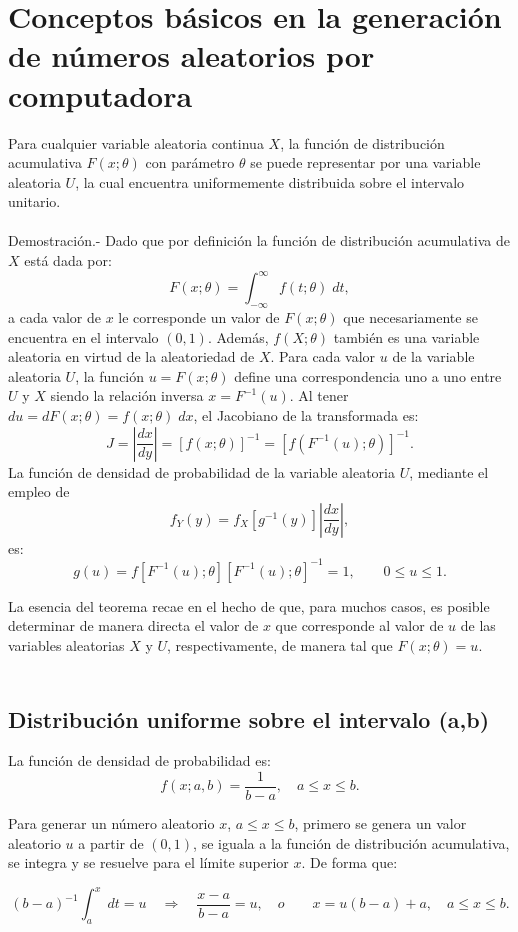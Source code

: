 \section{Conceptos básicos en la generación de números aleatorios por computadora}

\begin{teo}
    Para cualquier variable aleatoria continua $X$, la función de distribución acumulativa $F(x;\theta)$ con parámetro $\theta$ se puede representar por una variable aleatoria $U$, la cual encuentra uniformemente distribuida sobre el intervalo unitario.\\\\
	Demostración.-\; Dado que por definición la función de distribución acumulativa de $X$ está dada por:
	$$F(x;\theta)=\int_{-\infty}^\infty f(t;\theta)\; dt,$$
	a cada valor de $x$ le corresponde un valor de $F(x;\theta)$ que necesariamente se encuentra en el intervalo $(0,1)$. Además, $f(X;\theta)$ también es una variable aleatoria en virtud de la aleatoriedad de $X$. Para cada valor $u$ de la variable aleatoria $U$, la función $u=F(x;\theta)$ define una correspondencia uno a uno entre $U$ y $X$ siendo la relación inversa $x=F^{-1}(u)$. Al tener $du=dF(x;\theta)=f(x; \theta)\; dx$, el Jacobiano de la transformada es:
	$$J=\left|\dfrac{dx}{dy}\right|=[f(x;\theta)]^{-1}=\left[f\left(F^{-1}(u);\theta\right)\right]^{-1}.$$
	La función de densidad de probabilidad de la variable aleatoria $U$, mediante el empleo de $$f_Y(y)=f_X\left[g^{-1}(y)\right]\left|\dfrac{dx}{dy}\right|,$$ es:
	$$g(u)=f\left[F^{-1}(u);\theta\right]\left[F^{-1}(u);\theta\right]^{-1}=1,\qquad 0\leq u \leq 1.$$
\end{teo}
La esencia del teorema recae en el hecho de que, para muchos casos, es posible determinar de manera directa el valor de $x$ que corresponde al valor de $u$ de las variables aleatorias $X$ y $U$, respectivamente, de manera tal que $F(x;\theta)=u$. \\\\


\subsection{Distribución uniforme sobre el intervalo (a,b)}

La función de densidad de probabilidad es:
$$f(x;a,b)=\dfrac{1}{b-a},\quad a\leq x \leq b.$$

Para generar un número aleatorio $x$, $a\leq x \leq b$, primero se genera un valor aleatorio $u$ a partir de $(0,1)$, se iguala a la función de distribución acumulativa, se integra y se resuelve para el límite superior $x$. De forma que:
\begin{tcolorbox}
    $$(b-a)^{-1}\int_a^x \; dt = u \quad \Rightarrow \quad \dfrac{x-a}{b-a}=u, \quad o\qquad x=u(b-a)+a,\quad a\leq x \leq b.$$
\end{tcolorbox}

